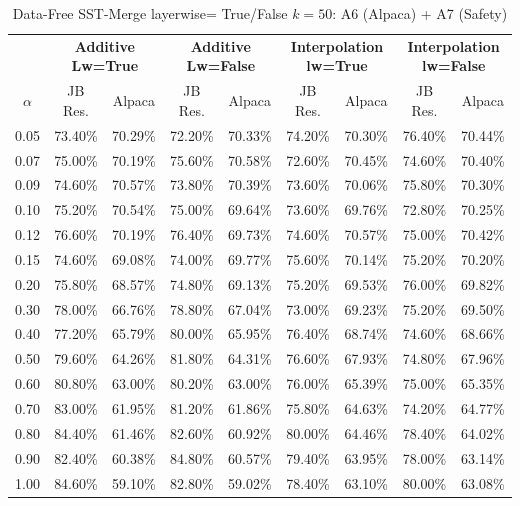 \begin{table}[h]
\centering
\caption{Data-Free SST-Merge layerwise= True/False $k=50$: A6 (Alpaca) + A7 (Safety)}
\label{tab:res_a6_a7_data_free_sst_50}
\begin{tabular}{c|cc|cc|cc|cc}
\hline
 & \multicolumn{2}{c|}{\textbf{Additive Lw=True}} & \multicolumn{2}{c|}{\textbf{Additive Lw=False}} & \multicolumn{2}{c|}{\textbf{Interpolation lw=True}}& \multicolumn{2}{c}{\textbf{Interpolation lw=False}} \\
$\alpha$ & JB Res. & Alpaca & JB Res. & Alpaca & JB Res. & Alpaca & JB Res. & Alpaca \\
\hline
0.05 & 73.40\% & 70.29\% & 72.20\% & 70.33\% & 74.20\% & 70.30\% & 76.40\% & 70.44\% \\
0.07 & 75.00\% & 70.19\% & 75.60\% & 70.58\% & 72.60\% & 70.45\% & 74.60\% & 70.40\% \\
0.09 & 74.60\% & 70.57\% & 73.80\% & 70.39\% & 73.60\% & 70.06\% & 75.80\% & 70.30\% \\
0.10 & 75.20\% & 70.54\% & 75.00\% & 69.64\% & 73.60\% & 69.76\% & 72.80\% & 70.25\% \\
0.12 & 76.60\% & 70.19\% & 76.40\% & 69.73\% & 74.60\% & 70.57\% & 75.00\% & 70.42\% \\
0.15 & 74.60\% & 69.08\% & 74.00\% & 69.77\% & 75.60\% & 70.14\% & 75.20\% & 70.20\% \\
0.20 & 75.80\% & 68.57\% & 74.80\% & 69.13\% & 75.20\% & 69.53\% & 76.00\% & 69.82\% \\
0.30 & 78.00\% & 66.76\% & 78.80\% & 67.04\% & 73.00\% & 69.23\% & 75.20\% & 69.50\% \\
0.40 & 77.20\% & 65.79\% & 80.00\% & 65.95\% & 76.40\% & 68.74\% & 74.60\% & 68.66\% \\
0.50 & 79.60\% & 64.26\% & 81.80\% & 64.31\% & 76.60\% & 67.93\% & 74.80\% & 67.96\% \\
0.60 & 80.80\% & 63.00\% & 80.20\% & 63.00\% & 76.00\% & 65.39\% & 75.00\% & 65.35\% \\
0.70 & 83.00\% & 61.95\% & 81.20\% & 61.86\% & 75.80\% & 64.63\% & 74.20\% & 64.77\% \\
0.80 & 84.40\% & 61.46\% & 82.60\% & 60.92\% & 80.00\% & 64.46\% & 78.40\% & 64.02\% \\
0.90 & 82.40\% & 60.38\% & 84.80\% & 60.57\% & 79.40\% & 63.95\% & 78.00\% & 63.14\% \\
1.00 & 84.60\% & 59.10\% & 82.80\% & 59.02\% & 78.40\% & 63.10\% & 80.00\% & 63.08\% \\
\hline
\end{tabular}
\end{table}
\FloatBarrier

